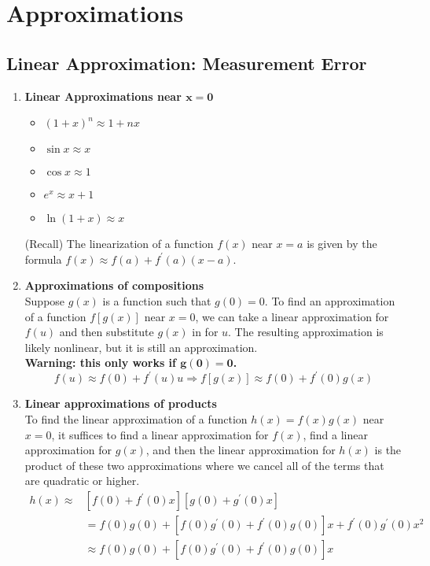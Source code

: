 \chapter{Approximations}
\section{Linear Approximation: Measurement Error}
\begin{enumerate}
    \item \textbf{Linear Approximations near $\bm{x=0}$}\\
        \begin{itemize}
            \item \((1+x)^n\approx 1+nx\)
            \item \(\sin x\approx x\)
            \item \(\cos x\approx 1\)
            \item \(e^x\approx x+1\)
            \item \(\ln(1+x)\approx x\)
        \end{itemize}
        \begin{note} (Recall) The linearization of a function \(f(x)\) near \(x=a\) is given by the formula \(f(x)\approx f(a)+f^\prime (a)(x-a)\). \end{note}
    \item \textbf{Approximations of compositions}\\
        \indent Suppose \(g(x)\) is a function such that \(g(0)=0\). To find an approximation of a function \(f[g(x)]\) near \(x=0\), we can take a linear approximation for \(f(u)\) and then substitute \(g(x)\) in for \(u\). The resulting approximation is likely nonlinear, but it is still an approximation.\\
        \indent\textbf{Warning: this only works if \(\bm{g(0)=0}\).}
        \[
            f(u)\approx f(0)+f^\prime (u)u\Rightarrow f[g(x)]\approx f(0)+f^\prime (0)g(x)
        \]
    \item \textbf{Linear approximations of products}\\
        \indent To find the linear approximation of a function \(h(x)=f(x)g(x)\) near \(x=0\), it suffices to find a linear approximation for \(f(x)\), find a linear approximation for \(g(x)\), and then the linear approximation for \(h(x)\) is the product of these two approximations where we cancel all of the terms that are quadratic or higher.
		\begin{align*}
            h(x)\approx{} & [f(0)+f^\prime (0)x][g(0)+g^\prime (0)x] \\
                 & =f(0)g(0)+[f(0)g^\prime (0)+f^\prime (0)g(0)]x+f^\prime (0)g^\prime (0)x^2 \\
                 & \approx f(0)g(0)+[f(0)g^\prime (0)+f^\prime (0)g(0)]x
        \end{align*}
\end{enumerate}

